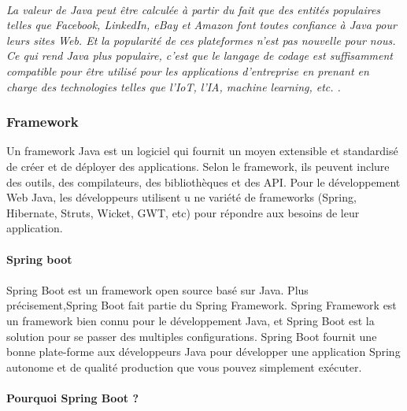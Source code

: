         \paragraph{}
        \textit{La valeur de Java peut être calculée à partir du fait que des entités populaires 
        telles que Facebook, LinkedIn, eBay et Amazon font toutes confiance à Java pour leurs 
        sites Web. Et la popularité de ces plateformes n'est pas nouvelle pour nous.
        Ce qui rend Java plus populaire, c'est que le langage de codage est suffisamment 
        compatible pour être utilisé pour les applications d'entreprise en prenant en charge 
        des technologies telles que l'IoT, l'IA, machine learning, etc. \cite{whyjava}.}
        
        \subsubsection{Framework }
        Un framework Java est un logiciel qui fournit un moyen extensible et standardisé de créer 
        et de déployer des applications. Selon le framework, ils peuvent inclure des outils, 
        des compilateurs, des bibliothèques et des API. Pour le développement Web Java, les développeurs utilisent u
        ne variété de frameworks (Spring, Hibernate, Struts, Wicket, GWT, etc) pour répondre aux besoins de 
        leur application.
        \paragraph{Spring boot}
        \paragraph{}
        Spring Boot est un framework open source basé sur Java.
        Plus précisement,Spring Boot fait partie du Spring Framework. 
        Spring Framework est un framework bien connu pour le développement Java, 
        et Spring Boot est la solution  pour se passer des multiples configurations. 
        Spring Boot fournit une bonne plate-forme aux développeurs Java pour 
        développer une application Spring autonome et de qualité production que vous pouvez simplement exécuter. 
        \paragraph{Pourquoi Spring Boot ?}
